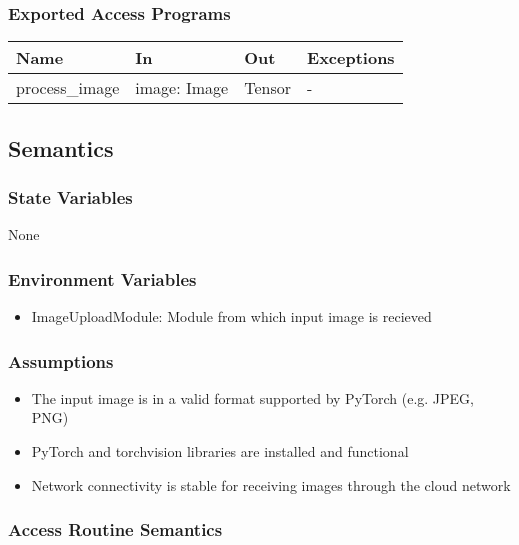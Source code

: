 \documentclass[12pt, titlepage]{article}
\begin{document}
\subsubsection{Exported Access Programs}

\begin{center}
\begin{tabular}{p{5cm} p{3cm} p{3cm} p{2cm}}
\hline
\textbf{Name} & \textbf{In} & \textbf{Out} & \textbf{Exceptions} \\
\hline
process{\_}image & image: Image & Tensor & - \\
\hline
\end{tabular}
\end{center}

\subsection{Semantics}

\subsubsection{State Variables}
None



\subsubsection{Environment Variables}
\begin{itemize}
  \item ImageUploadModule: Module from which input image is recieved
\end{itemize}

\subsubsection{Assumptions}
\begin{itemize}
  \item The input image is in a valid format supported by PyTorch (e.g. JPEG, PNG)
  \item PyTorch and torchvision libraries are installed and functional
  \item Network connectivity is stable for receiving images through the cloud network
\end{itemize}


\subsubsection{Access Routine Semantics}
\end{document}
